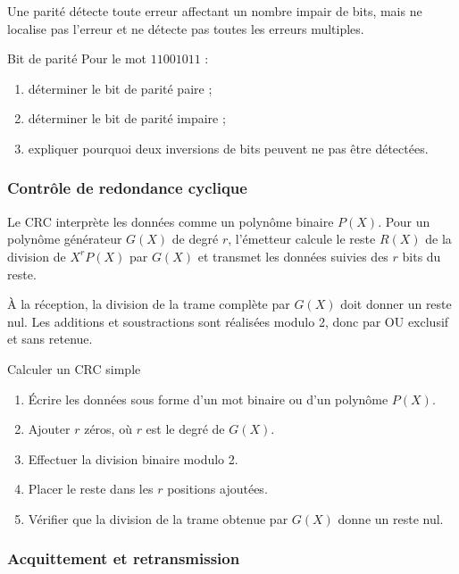 Une parité détecte toute erreur affectant un nombre impair de bits, mais ne localise pas l'erreur et ne détecte pas toutes les erreurs multiples.

\begin{TLLogicApplication}{Bit de parité}
Pour le mot $11001011$ :
\begin{enumerate}
  \item déterminer le bit de parité paire ;
  \item déterminer le bit de parité impaire ;
  \item expliquer pourquoi deux inversions de bits peuvent ne pas être détectées.
\end{enumerate}
\end{TLLogicApplication}

\subsubsection{Contrôle de redondance cyclique}

Le CRC interprète les données comme un polynôme binaire $P(X)$. Pour un polynôme générateur $G(X)$ de degré $r$, l'émetteur calcule le reste $R(X)$ de la division de $X^rP(X)$ par $G(X)$ et transmet les données suivies des $r$ bits du reste.

\begin{center}\TLMecanismeCRC\end{center}

À la réception, la division de la trame complète par $G(X)$ doit donner un reste nul. Les additions et soustractions sont réalisées modulo 2, donc par OU exclusif et sans retenue.

\begin{TLLogicMethod}{Calculer un CRC simple}
\begin{enumerate}
  \item Écrire les données sous forme d'un mot binaire ou d'un polynôme $P(X)$.
  \item Ajouter $r$ zéros, où $r$ est le degré de $G(X)$.
  \item Effectuer la division binaire modulo 2.
  \item Placer le reste dans les $r$ positions ajoutées.
  \item Vérifier que la division de la trame obtenue par $G(X)$ donne un reste nul.
\end{enumerate}
\end{TLLogicMethod}

\subsubsection{Acquittement et retransmission}

